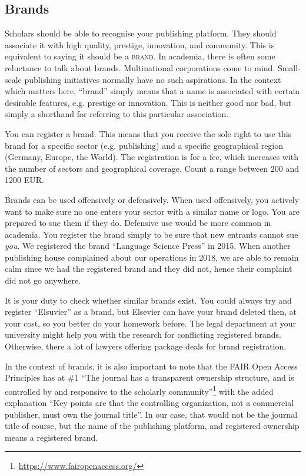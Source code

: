 \documentclass[guidelines,nonflat,modfonts] {langsci/langscibook}
\newcommand{\footurl}[1]{\footnote{\url{#1}}}
\begin{document}
\subsection{Brands}\label{sec:legal:brand}
Scholars should be able to recognise your publishing platform. They should associate it with high quality, prestige, innovation, and community. This is equivalent to saying it should be a \textsc{brand}. In academia, there is often some reluctance to talk about brands. Multinational corporations come to mind. Small-scale publishing initiatives normally have no such aspirations. In the context which matters here, ``brand'' simply means that a name is associated with certain desirable features, e.g. prestige or innovation. This is neither good nor bad, but simply a shorthand for referring to this particular association. 

You can register a brand. This means that you receive the sole right to use this brand for a specific sector (e.g. publishing) and a specific geographical region (Germany, Europe, the World). The registration is for a fee, which increases with the number of sectors and geographical coverage. Count a range between 200 and 1200 EUR. 

Brands can be used offensively or defensively. When used offensively, you actively want to make sure no one enters your sector with a similar name or logo. You are prepared to sue them if they do. Defensive use would be more common in academia. You register the brand simply to be sure that new entrants cannot sue \textit{you}. We registered the brand ``Language Science Press'' in 2015. When another publishing house complained about our operations in 2018, we are able to remain calm since we had the registered brand and they did not, hence their complaint did not go anywhere.

It is your duty to check whether similar brands exist. You could always try and register ``Elsuvier'' as a brand, but Elsevier can have your brand deleted then, at your cost, so you better do your homework before. The legal department at your university might help you with the research for conflicting registered brands. Otherwise, there a lot of lawyers offering package deals for brand registration. 

In the context of brands, it is also important to note that the FAIR Open Access Principles has at \#1 ``The journal has a transparent ownership structure, and is controlled by and responsive to the scholarly community''\footurl{https://www.fairopenaccess.org/} with the added explanation 
``Key points are that the controlling organization, not a commercial publisher, must own the journal title''. In our case, that would not be the journal title of course, but the name of the publishing platform, and registered ownership means a registered brand. 
 
\end{document}
